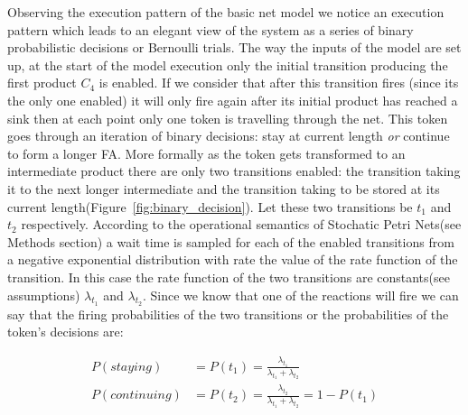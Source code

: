 Observing the execution pattern of the basic net model we notice an
execution pattern which leads to an elegant view of the system as a
series of binary probabilistic decisions or Bernoulli trials. The way
the inputs of the model are set up, at the start of the model
execution only the initial transition producing the first product $C_4$ is
enabled. If we consider that after this transition fires (since its
the only one enabled) it 
will only fire again after its initial product has reached a sink then
at each point only one token is travelling through the net. This token
goes through an iteration of binary decisions: stay at current length
\textit{or} continue to form a longer
FA. More formally as the token gets
transformed to an intermediate product there are only two transitions
enabled: the transition taking it to the next longer intermediate and
the transition taking to be stored at its current length(Figure~\ref{fig:binary_decision}). Let these
two transitions be $t_1$ and $t_2$ respectively. According to
the operational semantics of Stochatic Petri Nets(see Methods section)
a wait time is sampled for each of the enabled transitions from a
negative exponential distribution with rate the value of the rate
function of the
transition. In this case the rate function of the two transitions are
constants(see assumptions) $\lambda_{t_1}$ and $\lambda_{t_2}$. Since
we know that one of the reactions will fire we can say that the
firing probabilities of the two transitions or the probabilities of
the token's decisions are:

\begin{align*}
P(staying)& =P(t_1) = \frac{\lambda_{t_1}}{\lambda_{t_1} + \lambda_{t_2}}\\
P(continuing) & = P(t_2) = \frac{\lambda_{t_2}}{\lambda_{t_1} + \lambda_{t_2}} = 1 - P(t_1)\\
\end{align*}

